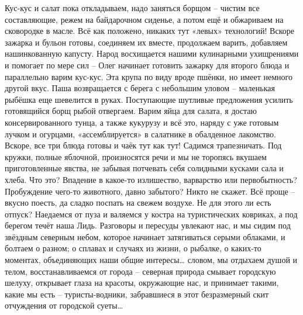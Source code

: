Кус-кус и салат пока откладываем, надо заняться борщом – чистим все составляющие, режем на байдарочном сиденье, а потом ещё и обжариваем на сковородке в масле. Всё как положено, никаких тут «левых» технологий! Вскоре зажарка и бульон готовы, соединяем их вместе, продолжаем варить, добавляем нашинкованную капусту. Народ восхищается нашими кулинарными ухищрениями и помогает по мере сил – Олег начинает готовить зажарку для второго блюда и параллельно варим кус-кус. Эта крупа по виду вроде пшёнки, но имеет немного другой вкус. Паша возвращается с берега с небольшим уловом – маленькая рыбёшка еще шевелится в руках. Поступающие шутливые предложения усилить готовящийся борщ рыбой отвергаем. 
Варим яйца для салата, я достаю консервированного тунца, а также кукурузу и всё это, наряду с уже готовым лучком и огурцами, «ассемблируется» в салатнике в обалденное лакомство. Вскоре, все три блюда готовы и чаёк тут как тут! Садимся трапезничать. Под кружки, полные яблочной, произносятся речи и мы не торопясь вкушаем приготовленные явства, не забывая потчевать себя солидными кусками сала и хлеба. 
Что это? Впадение в какое-то излишество, варварство или первобытность? Пробуждение чего-то животного, давно забытого? Никто не скажет. Всё проще – вкусно поесть, да сладко поспать на свежем воздухе. Не для этого ли есть отпуск? Наедаемся от пуза и валяемся у костра на туристических ковриках, а под берегом течёт наша Лидь. Разговоры и пересуды увлекают нас, и мы сидим под звёздным северным небом, которое начинает затягиваться серыми облаками, и болтаем о разном; о сплавах и случаях из жизни, о рыбалке, о каких-то моментах, объединяющих наши общие интересы… словом, мы отдыхаем душой и телом, восстанавливаемся от города – северная природа смывает городскую шелуху, открывает глаза на красоты, окружающие нас, и принимает такими, какие мы есть – туристы-водники, забравшиеся в этот безразмерный скит отчуждения от городской суеты… 

\begin{center}
\end{center}
